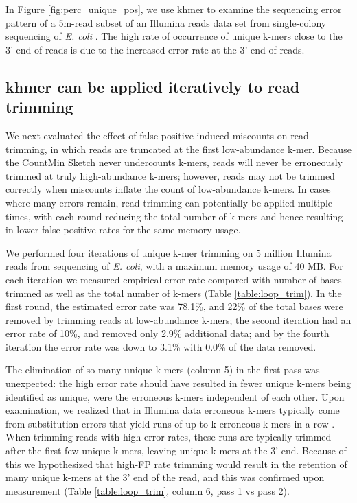 \documentclass[10pt]{article}
\begin{document}
In Figure \ref{fig:perc_unique_pos}, we use khmer to examine the
sequencing error pattern of a 5m-read subset of an Illumina reads data
set from single-colony sequencing of {\em E. coli}
\cite{pubmed21926975}.  The high rate of occurrence of unique k-mers
close to the 3' end of reads is due to the increased error rate at the
3' end of reads.

\subsection*{khmer can be applied iteratively to read trimming}

We next evaluated the effect of false-positive induced miscounts on
read trimming, in which reads are truncated at the first low-abundance
k-mer.  Because the CountMin Sketch never undercounts k-mers, reads
will never be erroneously trimmed at truly high-abundance k-mers;
however, reads may not be trimmed correctly when miscounts inflate the
count of low-abundance k-mers.  In cases where many errors remain,
read trimming can potentially be applied multiple times, with each
round reducing the total number of k-mers and hence resulting in lower
false positive rates for the same memory usage.

We performed four iterations of unique k-mer trimming on 5 million
Illumina reads from sequencing of {\em E. coli}, with a maximum memory
usage of 40 MB.  For each iteration we measured empirical error rate
compared with number of bases trimmed as well as the total number of
k-mers (Table \ref{table:loop_trim}).  In the first round, the
estimated error rate was 78.1\%, and 22\% of the total bases were
removed by trimming reads at low-abundance k-mers; the second
iteration had an error rate of 10\%, and removed only 2.9\% additional
data; and by the fourth iteration the error rate was down to 3.1\%
with 0.0\% of the data removed.

The elimination of so many unique k-mers (column 5) in the first pass
was unexpected: the high error rate should have resulted in fewer
unique k-mers being identified as unique, were the erroneous k-mers
independent of each other. Upon examination, we realized that in
Illumina data erroneous k-mers typically come from substitution errors
that yield runs of up to k erroneous k-mers in a row
\cite{Kelley2010}.  When trimming reads with high error rates, these
runs are typically trimmed after the first few unique k-mers, leaving
unique k-mers at the 3' end.  Because of this we hypothesized that
high-FP rate trimming would result in the retention of many unique
k-mers at the 3' end of the read, and this was confirmed upon
measurement (Table \ref{table:loop_trim}, column 6, pass 1 vs pass 2).
\end{document}
